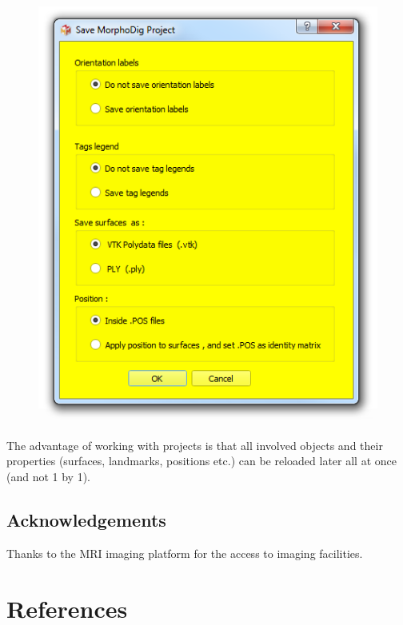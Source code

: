 \documentclass[12pt, a4paper]{book}
\begin{document}
\begin{figure}
  \centering  
 \includegraphics[scale=0.5]{../images/07/project/save_ntw.png}
\label{save_project_file}
\end{figure}

The advantage of working with projects is that all involved objects and their properties (surfaces, landmarks, positions etc.) can be reloaded later all at once (and not 1 by 1). 

\subsection{Acknowledgements}
Thanks to the MRI imaging platform for the access to imaging facilities.



\section{References}
 		
\end{document}
